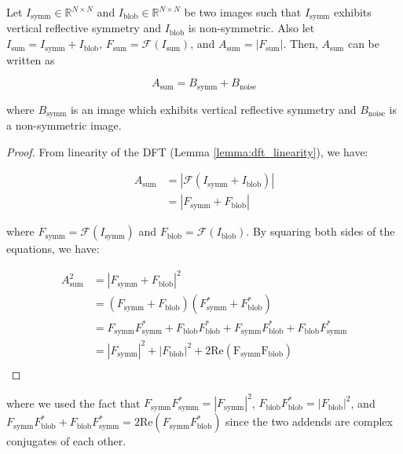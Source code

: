 
\begin{theorem}
    Let $I_\mathrm{symm}\in\mathbb{R}^{N\times N}$ and $I_\mathrm{blob}\in\mathbb{R}^{N\times N}$ be two images such that $I_\mathrm{symm}$ exhibits vertical reflective symmetry and $I_\mathrm{blob}$ is non-symmetric. Also let $I_\mathrm{sum} = I_\mathrm{symm} + I_\mathrm{blob}$, $F_\mathrm{sum}=\mathcal{F}(I_\mathrm{sum})$, and $A_\mathrm{sum}=|F_\mathrm{sum}|$. Then, $A_\mathrm{sum}$ can be written as

    \begin{equation}
        A_\mathrm{sum} = B_\mathrm{symm} + B_\mathrm{noise}
    \end{equation}

    where $B_\mathrm{symm}$ is an image which exhibits vertical reflective symmetry and $B_\mathrm{noise}$ is a non-symmetric image.
\end{theorem}

\begin{proof}
    From linearity of the DFT (Lemma \ref{lemma:dft_linearity}), we have:

    \begin{align}
        A_\mathrm{sum} &= |\mathcal{F}(I_\mathrm{symm} + I_\mathrm{blob})|\\
        &= |F_\mathrm{symm} + F_\mathrm{blob}|
    \end{align}

    where $F_\mathrm{symm} = \mathcal{F}(I_\mathrm{symm})$ and $F_\mathrm{blob} = \mathcal{F}(I_\mathrm{blob})$. By squaring both sides of the equations, we have:

    \begin{align}
        A^2_\mathrm{sum} &= |F_\mathrm{symm} + F_\mathrm{blob}|^2\\
        &= (F_\mathrm{symm} + F_\mathrm{blob})(F^*_\mathrm{symm} + F^*_\mathrm{blob})\\
        &= F_\mathrm{symm}F^*_\mathrm{symm} + F_\mathrm{blob}F^*_\mathrm{blob} + F_\mathrm{symm}F^*_\mathrm{blob} + F_\mathrm{blob}F^*_\mathrm{symm}\\
        &= |F_\mathrm{symm}|^2 + |F_\mathrm{blob}|^2 + 2\mathrm{Re(F_\mathrm{symm} F_\mathrm{blob})}\\
    \end{align}
\end{proof}

where we used the fact that $F_\mathrm{symm}F^*_\mathrm{symm} = |F_\mathrm{symm}|^2$, $F_\mathrm{blob}F^*_\mathrm{blob} = |F_\mathrm{blob}|^2$, and $F_\mathrm{symm}F^*_\mathrm{blob} + F_\mathrm{blob}F^*_\mathrm{symm}=2\mathrm{Re}(F_\mathrm{symm}F^*_\mathrm{blob})$ since the two addends are complex conjugates of each other.




